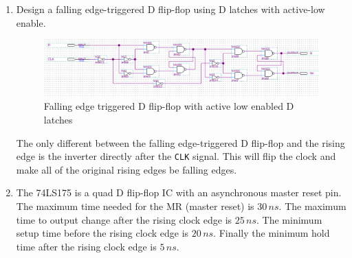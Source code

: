 \documentclass[CMPE]{KGCOEReport}
\begin{document}
\begin{enumerate}

\item Design a falling edge-triggered D flip-flop using D latches with active-low enable.

\begin{figure}[h!]
	\centering
	\includegraphics[width=\textwidth]{q1.png}
	\caption{Falling edge triggered D flip-flop with active low enabled D latches}
	\label{fig:q1}
\end{figure}

The only different between the falling edge-triggered D flip-flop and the rising edge is the inverter directly after the \texttt{CLK} signal. This will flip the clock and make all of the original rising edges be falling edges.

\item The 74LS175 is a quad D flip-flop IC with an asynchronous master reset pin. The maximum time needed for the MR (master reset) is $30\,ns$. The maximum time to output change after the rising clock edge is $25\,ns$. The minimum setup time before the rising clock edge is $20\,ns$. Finally the minimum hold time after the rising clock edge is $5\,ns$.

\end{enumerate}
\end{document}
